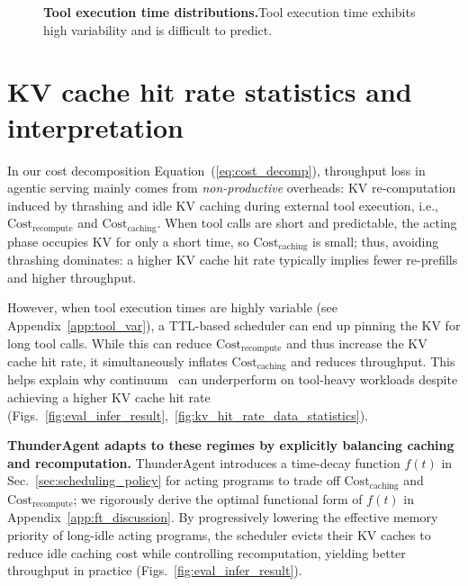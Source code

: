 \begin{figure}[]
  \caption{\textbf{Tool execution time distributions.}Tool execution time exhibits high variability and is difficult to predict.}

  \label{fig:tool_time}
\end{figure}

\newpage
\section{KV cache hit rate statistics and interpretation}
\label{sec:kv_hit_rate_stats}

In our cost decomposition Equation~(\ref{eq:cost_decomp}), throughput loss in agentic serving mainly comes from \emph{non-productive} overheads:
KV re-computation induced by thrashing and idle KV caching during external tool execution, i.e.,
$\text{Cost}_{\text{recompute}}$ and $\text{Cost}_{\text{caching}}$. When tool calls are short and predictable, the acting phase occupies KV for only a short time, so $\text{Cost}_{\text{caching}}$ is small; thus, avoiding thrashing dominates: a higher KV cache hit rate typically implies fewer re-prefills and higher throughput.

However, when tool execution times are highly variable (see Appendix~\ref{app:tool_var}), a TTL-based scheduler can end up pinning the KV for long tool calls.
While this can reduce $\text{Cost}_{\text{recompute}}$ and thus increase the KV cache hit rate, it simultaneously inflates $\text{Cost}_{\text{caching}}$ and reduces throughput. This helps explain why continuum~\cite{li2025continuumefficientrobustmultiturn} can underperform on tool-heavy workloads despite achieving a higher KV cache hit rate (Figs.~\ref{fig:eval_infer_result},~\ref{fig:kv_hit_rate_data_statistics}).

\noindent\textbf{ThunderAgent adapts to these regimes by explicitly balancing caching and recomputation.}
ThunderAgent introduces a time-decay function $f(t)$ in Sec.~\ref{sec:scheduling_policy} for acting programs to trade off
$\text{Cost}_{\text{caching}}$ and $\text{Cost}_{\text{recompute}}$; we rigorously derive the optimal functional form of \(f(t)\) in Appendix~\ref{app:ft_discussion}.
By progressively lowering the effective memory priority of long-idle acting programs, the scheduler evicts their KV caches
to reduce idle caching cost while controlling recomputation, yielding better throughput in practice (Figs.~\ref{fig:eval_infer_result}).







